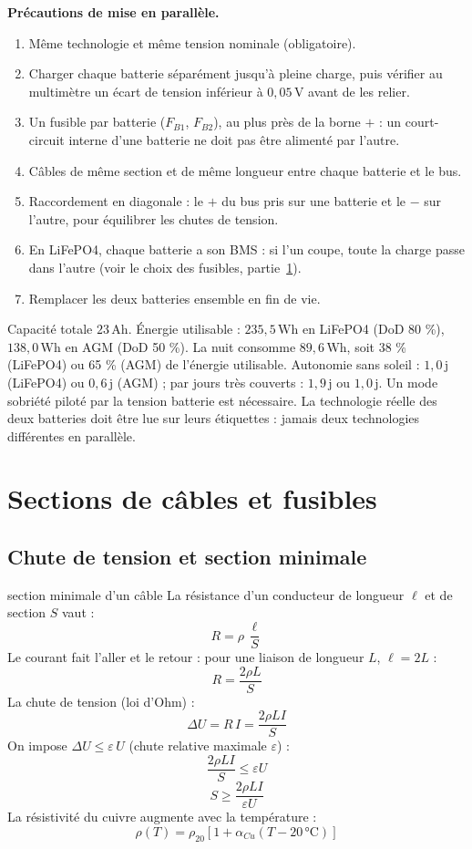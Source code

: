 \documentclass[11pt,a4paper]{article}
\newcommand{\U}[1]{\,\mathrm{#1}}
\begin{document}
\textbf{Précautions de mise en parallèle.}
\begin{enumerate}[nosep]
\item Même technologie et même tension nominale (obligatoire).
\item Charger chaque batterie séparément jusqu'à pleine charge, puis vérifier au multimètre un écart de tension inférieur à $0{,}05\U{V}$ avant de les relier.
\item Un fusible par batterie ($F_{B1}$, $F_{B2}$), au plus près de la borne $+$ : un court-circuit interne d'une batterie ne doit pas être alimenté par l'autre.
\item Câbles de même section et de même longueur entre chaque batterie et le bus.
\item Raccordement \og en diagonale \fg : le $+$ du bus pris sur une batterie et le $-$ sur l'autre, pour équilibrer les chutes de tension.
\item En LiFePO4, chaque batterie a son BMS : si l'un coupe, toute la charge passe dans l'autre (voir le choix des fusibles, partie~\ref{sec:cables}).
\item Remplacer les deux batteries ensemble en fin de vie.
\end{enumerate}

\begin{resume}
Capacité totale $23\U{Ah}$. Énergie utilisable : $235{,}5\U{Wh}$ en LiFePO4 (DoD 80 \%), $138{,}0\U{Wh}$ en AGM (DoD 50 \%). La nuit consomme $89{,}6\U{Wh}$, soit 38 \% (LiFePO4) ou 65 \% (AGM) de l'énergie utilisable. Autonomie sans soleil : $1{,}0\U{j}$ (LiFePO4) ou $0{,}6\U{j}$ (AGM) ; par jours très couverts : $1{,}9\U{j}$ ou $1{,}0\U{j}$. Un mode sobriété piloté par la tension batterie est nécessaire. La technologie réelle des deux batteries doit être lue sur leurs étiquettes : jamais deux technologies différentes en parallèle.
\end{resume}

\newpage
\section{Sections de câbles et fusibles}
\label{sec:cables}

\subsection{Chute de tension et section minimale}

\begin{demo}{section minimale d'un câble}
La résistance d'un conducteur de longueur $\ell$ et de section $S$ vaut :
\[
R = \rho \, \frac{\ell}{S}
\]
Le courant fait l'aller et le retour : pour une liaison de longueur $L$, $\ell = 2L$ :
\[
R = \frac{2 \rho L}{S}
\]
La chute de tension (loi d'Ohm) :
\[
\Delta U = R \, I = \frac{2 \rho L I}{S}
\]
On impose $\Delta U \le \varepsilon \, U$ (chute relative maximale $\varepsilon$) :
\[
\frac{2 \rho L I}{S} \le \varepsilon U
\]
\[
S \ge \frac{2 \rho L I}{\varepsilon U}
\]
La résistivité du cuivre augmente avec la température :
\[
\rho(T) = \rho_{20} \left[ 1 + \alpha_{Cu} (T - 20\U{°C}) \right]
\]
\end{demo}
\end{document}
